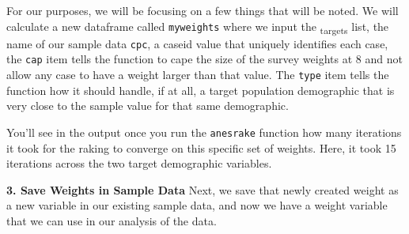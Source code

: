 \documentclass[
  letterpaper,
  DIV=11,
  numbers=noendperiod]{scrreprt}
\newenvironment{Shaded}{\begin{snugshade}}{\end{snugshade}}
\newcommand{\AttributeTok}[1]{\textcolor[rgb]{0.40,0.45,0.13}{#1}}
\newcommand{\CommentTok}[1]{\textcolor[rgb]{0.37,0.37,0.37}{#1}}
\newcommand{\DecValTok}[1]{\textcolor[rgb]{0.68,0.00,0.00}{#1}}
\newcommand{\FunctionTok}[1]{\textcolor[rgb]{0.28,0.35,0.67}{#1}}
\newcommand{\NormalTok}[1]{\textcolor[rgb]{0.00,0.23,0.31}{#1}}
\newcommand{\OtherTok}[1]{\textcolor[rgb]{0.00,0.23,0.31}{#1}}
\newcommand{\SpecialCharTok}[1]{\textcolor[rgb]{0.37,0.37,0.37}{#1}}
\newcommand{\StringTok}[1]{\textcolor[rgb]{0.13,0.47,0.30}{#1}}
\begin{document}
For our purposes, we will be focusing on a few things that will be
noted. We will calculate a new dataframe called \texttt{myweights} where
we input the \textsubscript{targets} list, the name of our sample data
\texttt{cpc}, a caseid value that uniquely identifies each case, the
\texttt{cap} item tells the function to cape the size of the survey
weights at 8 and not allow any case to have a weight larger than that
value. The \texttt{type} item tells the function how it should handle,
if at all, a target population demographic that is very close to the
sample value for that same demographic.

You'll see in the output once you run the \texttt{anesrake} function how
many iterations it took for the raking to converge on this specific set
of weights. Here, it took 15 iterations across the two target
demographic variables.

\textbf{3. Save Weights in Sample Data} Next, we save that newly created
weight as a new variable in our existing sample data, and now we have a
weight variable that we can use in our analysis of the data.

\begin{Shaded}
\end{Shaded}
\end{document}
